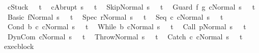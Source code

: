 \begin{isabellebody}
\ \ {\isachardoublequoteopen}{\isasymGamma}{\isasymturnstile}{\isasymlangle}c{\isacharcomma}Stuck{\isasymrangle}\ {\isasymRightarrow}\ \ t{\isachardoublequoteclose}\isanewline
\ \ {\isachardoublequoteopen}{\isasymGamma}{\isasymturnstile}{\isasymlangle}c{\isacharcomma}Abrupt\ s{\isasymrangle}\ {\isasymRightarrow}\ \ t{\isachardoublequoteclose}\isanewline
\ \ {\isachardoublequoteopen}{\isasymGamma}{\isasymturnstile}{\isasymlangle}Skip{\isacharcomma}Normal\ s{\isasymrangle}\ {\isasymRightarrow}\ \ t{\isachardoublequoteclose}\isanewline
\ \ {\isachardoublequoteopen}{\isasymGamma}{\isasymturnstile}{\isasymlangle}Guard\ f\ g\ c{\isacharcomma}Normal\ s{\isasymrangle}\ {\isasymRightarrow}\ \ t{\isachardoublequoteclose}\isanewline
\ \ {\isachardoublequoteopen}{\isasymGamma}{\isasymturnstile}{\isasymlangle}Basic\ f{\isacharcomma}Normal\ s{\isasymrangle}\ {\isasymRightarrow}\ \ t{\isachardoublequoteclose}\isanewline
\ \ {\isachardoublequoteopen}{\isasymGamma}{\isasymturnstile}{\isasymlangle}Spec\ r{\isacharcomma}Normal\ s{\isasymrangle}\ {\isasymRightarrow}\ \ t{\isachardoublequoteclose}\isanewline
\ \ {\isachardoublequoteopen}{\isasymGamma}{\isasymturnstile}{\isasymlangle}Seq\ c{}\ c{}{\isacharcomma}Normal\ s{\isasymrangle}\ {\isasymRightarrow}\ \ t{\isachardoublequoteclose}\isanewline
\ \ {\isachardoublequoteopen}{\isasymGamma}{\isasymturnstile}{\isasymlangle}Cond\ b\ c{}\ c{}{\isacharcomma}Normal\ s{\isasymrangle}\ {\isasymRightarrow}\ \ t{\isachardoublequoteclose}\isanewline
\ \ {\isachardoublequoteopen}{\isasymGamma}{\isasymturnstile}{\isasymlangle}While\ b\ c{\isacharcomma}Normal\ s{\isasymrangle}\ {\isasymRightarrow}\ \ t{\isachardoublequoteclose}\isanewline
\ \ {\isachardoublequoteopen}{\isasymGamma}{\isasymturnstile}{\isasymlangle}Call\ p{\isacharcomma}Normal\ s{\isasymrangle}\ {\isasymRightarrow}\ \ t{\isachardoublequoteclose}\isanewline
\ \ {\isachardoublequoteopen}{\isasymGamma}{\isasymturnstile}{\isasymlangle}DynCom\ c{\isacharcomma}Normal\ s{\isasymrangle}\ {\isasymRightarrow}\ \ t{\isachardoublequoteclose}\isanewline
\ \ {\isachardoublequoteopen}{\isasymGamma}{\isasymturnstile}{\isasymlangle}Throw{\isacharcomma}Normal\ s{\isasymrangle}\ {\isasymRightarrow}\ \ t{\isachardoublequoteclose}\isanewline
\ \ {\isachardoublequoteopen}{\isasymGamma}{\isasymturnstile}{\isasymlangle}Catch\ c{}\ c{}{\isacharcomma}Normal\ s{\isasymrangle}\ {\isasymRightarrow}\ \ t{\isachardoublequoteclose}\isanewline
\isanewline
{}\isamarkupfalse%
\ exec{\isacharunderscore}block{\isacharcolon}\ \isanewline

\end{isabellebody}
